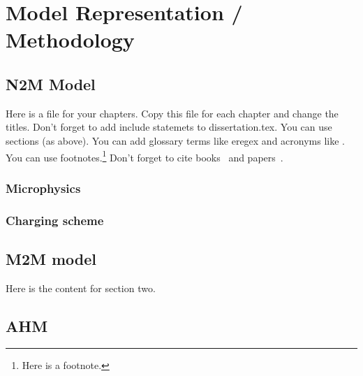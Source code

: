  
\chapter{Model Representation / Methodology}
\resetfootnote %

\section{N2M Model}

Here is a file for your chapters.  Copy this file for each chapter 
and change the titles.  Don't forget to add include statemets to 
dissertation.tex.  
You can use sections (as above).  
You can add glossary terms like \gls{eregex} and acronyms like .
You can use footnotes.\footnote{Here is a footnote.}
Don't forget to cite books~\cite{Sipser} and papers~\cite{CarleNarendran}.

\subsection{Microphysics}
\subsection{Charging scheme}

\section{M2M model }

Here is the content for section two.

\section{AHM}
